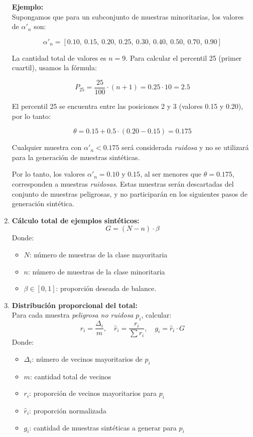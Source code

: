 \documentclass[12pt]{article}
\begin{document}
\begin{enumerate}[label=\textbf{\arabic*.}]
    \vspace{1em}
    \noindent \textbf{Ejemplo:} \\
    Supongamos que para un subconjunto de muestras minoritarias, los valores de \( \alpha'_n \) son:
    
    \[
    \alpha'_n = [0.10,\ 0.15,\ 0.20,\ 0.25,\ 0.30,\ 0.40,\ 0.50,\ 0.70,\ 0.90]
    \]
    
    La cantidad total de valores es \( n = 9 \). Para calcular el percentil 25 (primer cuartil), usamos la fórmula:
    
    \[
    P_{25} = \frac{25}{100} \cdot (n + 1) = 0.25 \cdot 10 = 2.5
    \]
    
    El percentil 25 se encuentra entre las posiciones 2 y 3 (valores 0.15 y 0.20), por lo tanto:
    
    \[
    \theta = 0.15 + 0.5 \cdot (0.20 - 0.15) = 0.175
    \]
    
    Cualquier muestra con \( \alpha'_n < 0.175 \) será considerada \emph{ruidosa} y no se utilizará para la generación de muestras sintéticas.

    \noindent Por lo tanto, los valores \( \alpha'_n = 0.10 \) y \( 0.15 \), al ser menores que \( \theta = 0.175 \), corresponden a muestras \emph{ruidosas}. Estas muestras serán descartadas del conjunto de muestras peligrosas, y no participarán en los siguientes pasos de generación sintética.

    \item \textbf{Cálculo total de ejemplos sintéticos:}
    \[
    G = (N - n) \cdot \beta
    \]
    Donde:
    \begin{itemize}
        \item \( N \): número de muestras de la clase mayoritaria
        \item \( n \): número de muestras de la clase minoritaria
        \item \( \beta \in [0,1] \): proporción deseada de balance.
    \end{itemize}

    \item \textbf{Distribución proporcional del total:}\\
    Para cada muestra \emph{peligrosa no ruidosa} \( p_i \), calcular:
    \[
    r_i = \frac{\Delta_i}{m}, \quad 
    \hat{r}_i = \frac{r_i}{\sum r_i}, \quad 
    g_i = \hat{r}_i \cdot G
    \]
    Donde:
    \begin{itemize}
        \item \( \Delta_i \): número de vecinos mayoritarios de \( p_i \)
        \item \( m \): cantidad total de vecinos
        \item \( r_i \): proporción de vecinos mayoritarios para \( p_i \)
        \item \( \hat{r}_i \): proporción normalizada
        \item \( g_i \): cantidad de muestras sintéticas a generar para \( p_i \)
    \end{itemize}


\end{enumerate}
\end{document}
